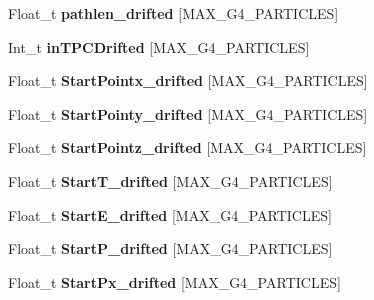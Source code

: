 \begin{DoxyCompactItemize}
\item 
\hypertarget{classanatree_a10be797dd4bcb299896e159ba44755b6}{Float\-\_\-t {\bfseries pathlen\-\_\-drifted} \mbox{[}M\-A\-X\-\_\-\-G4\-\_\-\-P\-A\-R\-T\-I\-C\-L\-E\-S\mbox{]}}\label{classanatree_a10be797dd4bcb299896e159ba44755b6}

\item 
\hypertarget{classanatree_af0d8948732aa5f642cdb5e376d432b2e}{Int\-\_\-t {\bfseries in\-T\-P\-C\-Drifted} \mbox{[}M\-A\-X\-\_\-\-G4\-\_\-\-P\-A\-R\-T\-I\-C\-L\-E\-S\mbox{]}}\label{classanatree_af0d8948732aa5f642cdb5e376d432b2e}

\item 
\hypertarget{classanatree_a9e41c51e5868649eb19b24de07640f9d}{Float\-\_\-t {\bfseries Start\-Pointx\-\_\-drifted} \mbox{[}M\-A\-X\-\_\-\-G4\-\_\-\-P\-A\-R\-T\-I\-C\-L\-E\-S\mbox{]}}\label{classanatree_a9e41c51e5868649eb19b24de07640f9d}

\item 
\hypertarget{classanatree_a79ef86416f1ee4bacad0b4e007311d27}{Float\-\_\-t {\bfseries Start\-Pointy\-\_\-drifted} \mbox{[}M\-A\-X\-\_\-\-G4\-\_\-\-P\-A\-R\-T\-I\-C\-L\-E\-S\mbox{]}}\label{classanatree_a79ef86416f1ee4bacad0b4e007311d27}

\item 
\hypertarget{classanatree_a6a10be4f89bfbfff86e9f5d61d58725d}{Float\-\_\-t {\bfseries Start\-Pointz\-\_\-drifted} \mbox{[}M\-A\-X\-\_\-\-G4\-\_\-\-P\-A\-R\-T\-I\-C\-L\-E\-S\mbox{]}}\label{classanatree_a6a10be4f89bfbfff86e9f5d61d58725d}

\item 
\hypertarget{classanatree_ad61483d1a304b519dd3c5a0ddd601939}{Float\-\_\-t {\bfseries Start\-T\-\_\-drifted} \mbox{[}M\-A\-X\-\_\-\-G4\-\_\-\-P\-A\-R\-T\-I\-C\-L\-E\-S\mbox{]}}\label{classanatree_ad61483d1a304b519dd3c5a0ddd601939}

\item 
\hypertarget{classanatree_a3336eb8232966f8e21de7f4e99e910ec}{Float\-\_\-t {\bfseries Start\-E\-\_\-drifted} \mbox{[}M\-A\-X\-\_\-\-G4\-\_\-\-P\-A\-R\-T\-I\-C\-L\-E\-S\mbox{]}}\label{classanatree_a3336eb8232966f8e21de7f4e99e910ec}

\item 
\hypertarget{classanatree_a95e77cfd37a96804f7d6622ed4405014}{Float\-\_\-t {\bfseries Start\-P\-\_\-drifted} \mbox{[}M\-A\-X\-\_\-\-G4\-\_\-\-P\-A\-R\-T\-I\-C\-L\-E\-S\mbox{]}}\label{classanatree_a95e77cfd37a96804f7d6622ed4405014}

\item 
\hypertarget{classanatree_aa7bb55560acb91e78a207e03ff517031}{Float\-\_\-t {\bfseries Start\-Px\-\_\-drifted} \mbox{[}M\-A\-X\-\_\-\-G4\-\_\-\-P\-A\-R\-T\-I\-C\-L\-E\-S\mbox{]}}\label{classanatree_aa7bb55560acb91e78a207e03ff517031}


\end{DoxyCompactItemize}
